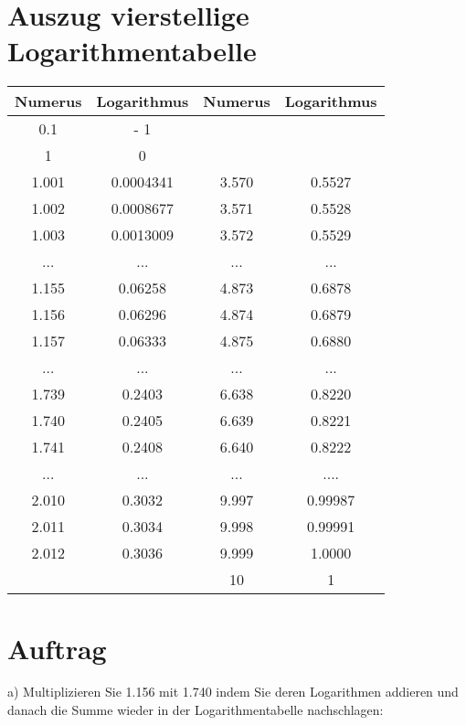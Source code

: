 




\renewcommand{\metaHeaderLine}{Logarithmen}
\renewcommand{\arbeitsblattTitel}{Multiplikation durch Addition}

\arbeitsblattHeader{}

\section*{Auszug vierstellige Logarithmentabelle}

\begin{tabular}{|c|c|| c | c |}\hline
Numerus & Logarithmus & Numerus & Logarithmus\\\hline
0.1   & - 1        &   &  \\\hline
1     & 0          &   &  \\\hline
1.001 & 0.0004341  & 3.570 & 0.5527\\
1.002 & 0.0008677  & 3.571 & 0.5528\\
1.003 & 0.0013009  & 3.572 & 0.5529\\
...   & ...        & ...   & ... \\
1.155 & 0.06258    & 4.873 & 0.6878\\
1.156 & 0.06296    & 4.874 & 0.6879\\
1.157 & 0.06333    & 4.875 & 0.6880\\
...   & ...        & ...   & ...  \\
1.739 & 0.2403     & 6.638 & 0.8220\\
1.740 & 0.2405     & 6.639 & 0.8221\\
1.741 & 0.2408     & 6.640 & 0.8222\\
...   & ...        & ...   & ....\\
2.010 & 0.3032     & 9.997 & 0.99987\\
2.011 & 0.3034     & 9.998 & 0.99991\\
2.012 & 0.3036     & 9.999 & 1.0000\\\hline
      &            & 10    & 1\\\hline
\end{tabular}
 
\section*{Auftrag}
a) Multiplizieren Sie 1.156 mit 1.740 indem Sie deren Logarithmen
addieren und danach die Summe wieder in der Logarithmentabelle
nachschlagen:

